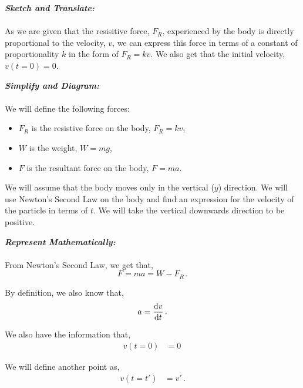 \begin{subquestions}
\subquestion

\begin{subsubquestions}
	
\subsubquestion

\textbf{\textit{Sketch and Translate:}} \\ \\
As we are given that the resisitive force, $F_R$, experienced by the body is directly proportional to the velocity, $v$, we can express this force in terms of a constant of proportionality $k$ in the form of $F_R=kv.$ We also get that the initial velocity, $v(t=0)=0$.




\textbf{\textit{Simplify and Diagram:}} \\ \\
We will define the following forces:
\begin{itemize}
	\item $F_R$ is the resistive force on the body, $F_R=kv$,
	\item $W$ is the weight, $W=mg$,
	\item $F$ is the resultant force on the body, $F=ma$.
\end{itemize}
We will assume that the body moves only in the vertical ($y$) direction. We will use Newton's Second Law on the body and find an expression for the velocity of the particle in terms of $t$.
We will take the vertical downwards direction to be positive.




\textbf{\textit{Represent Mathematically:}} \\ \\
From Newton's Second Law, we get that,
\begin{equation}
	F = ma = W - F_R \label{2005:q5:FEqn1} \,.
\end{equation}

By definition, we also know that,
\begin{equation}
	a = \frac{\mathrm{d}v}{\mathrm{d}t} \label{2005:q5:AEqn2} \,.
\end{equation}

We also have the information that,
\begin{align}
	v(t=0) & = 0 \,
\end{align}

We will define another point as,
\begin{align}
	v(t=t') & = v' \,.
\end{align}




\end{subsubquestions}
\end{subquestions}
